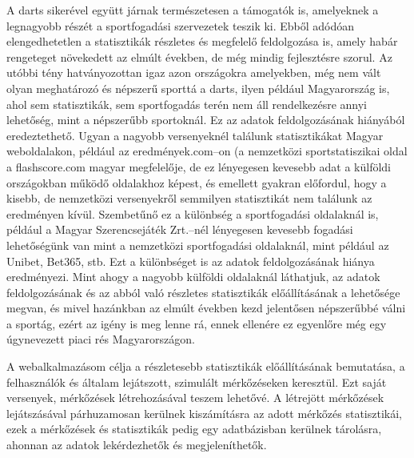 A darts sikerével együtt járnak természetesen a támogatók is, amelyeknek a legnagyobb részét a sportfogadási szervezetek teszik ki. Ebből adódóan elengedhetetlen a statisztikák részletes és megfelelő feldolgozása is, amely habár rengeteget növekedett az elmúlt években, de még mindig fejlesztésre szorul. Az utóbbi tény hatványozottan igaz azon országokra amelyekben, még nem vált olyan meghatározó és népszerű sporttá a darts, ilyen például Magyarország is, ahol sem statisztikák, sem sportfogadás terén nem áll rendelkezésre annyi lehetőség, mint a népszerűbb sportoknál. Ez az adatok feldolgozásának hiányából eredeztethető. Ugyan a nagyobb versenyeknél találunk statisztikákat Magyar weboldalakon, például az eredmények.com–on (a nemzetközi sportstatiszikai oldal a flashscore.com magyar megfelelője, de ez lényegesen kevesebb adat a külföldi országokban működő oldalakhoz képest, és emellett gyakran előfordul, hogy a kisebb, de nemzetközi versenyekről semmilyen statisztikát nem találunk az eredményen kívül. Szembetűnő ez a különbség a sportfogadási oldalaknál is, például a Magyar Szerencsejáték Zrt.–nél lényegesen kevesebb fogadási lehetőségünk van mint a nemzetközi sportfogadási oldalaknál, mint például az Unibet, Bet365, stb. Ezt a különbséget is az adatok feldolgozásának hiánya eredményezi. Mint ahogy a nagyobb külföldi oldalaknál láthatjuk, az adatok feldolgozásának és az abból való részletes statisztikák előállításának a lehetősége megvan, és mivel hazánkban az elmúlt években kezd jelentősen népszerűbbé válni a sportág, ezért az igény is meg lenne rá, ennek ellenére ez egyenlőre még egy úgynevezett piaci rés Magyarországon.

A webalkalmazásom célja a részletesebb statisztikák előállításának bemutatása, a felhasználók és általam lejátszott, szimulált mérkőzéseken keresztül. Ezt saját versenyek, mérkőzések létrehozásával teszem lehetővé. A létrejött mérkőzések lejátszásával párhuzamosan kerülnek kiszámításra az adott mérkőzés statisztikái, ezek a mérkőzések és statisztikák pedig egy adatbázisban kerülnek tárolásra, ahonnan az adatok lekérdezhetők és megjeleníthetők.
